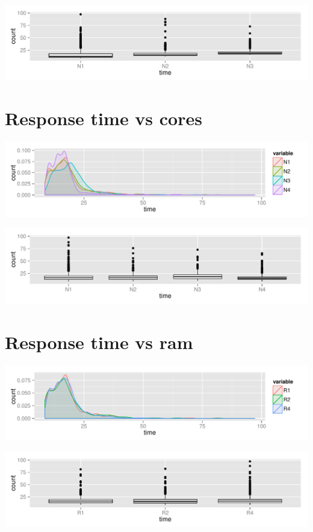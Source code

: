 \documentclass[12pt,a4]{article}
\begin{document}
\includegraphics[width=.9\linewidth]{figures/response-time-vs-numsrvc-box-plot.pdf}

\section{Response time vs cores}
\label{sec-4}

\includegraphics[width=.9\linewidth]{figures/response-time-vs-core.pdf}

\includegraphics[width=.9\linewidth]{figures/response-time-vs-core-box-plot.pdf}

\section{Response time vs ram}
\label{sec-5}

\includegraphics[width=.9\linewidth]{figures/response-time-vs-ram.pdf}

\includegraphics[width=.9\linewidth]{figures/response-time-vs-ram-box-plot.pdf}
\end{document}
